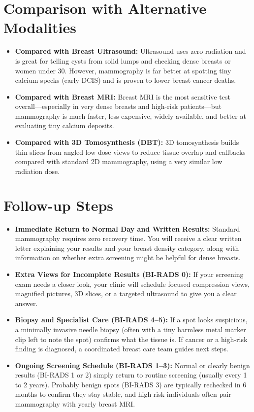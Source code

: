\section{Comparison with Alternative Modalities}

\begin{itemize}
    \item \textbf{Compared with Breast Ultrasound:} Ultrasound uses zero radiation and is great for telling cysts from solid lumps and checking dense breasts or women under 30. However, mammography is far better at spotting tiny calcium specks (early DCIS) and is proven to lower breast cancer deaths.
    \item \textbf{Compared with Breast MRI:} Breast MRI is the most sensitive test overall---especially in very dense breasts and high-risk patients---but mammography is much faster, less expensive, widely available, and better at evaluating tiny calcium deposits.
    \item \textbf{Compared with 3D Tomosynthesis (DBT):} 3D tomosynthesis builds thin slices from angled low-dose views to reduce tissue overlap and callbacks compared with standard 2D mammography, using a very similar low radiation dose.
\end{itemize}

\section{Follow-up Steps}

\begin{itemize}
    \item \textbf{Immediate Return to Normal Day and Written Results:} Standard mammography requires zero recovery time. You will receive a clear written letter explaining your results and your breast density category, along with information on whether extra screening might be helpful for dense breasts.
    \item \textbf{Extra Views for Incomplete Results (BI-RADS 0):} If your screening exam needs a closer look, your clinic will schedule focused compression views, magnified pictures, 3D slices, or a targeted ultrasound to give you a clear answer.
    \item \textbf{Biopsy and Specialist Care (BI-RADS 4--5):} If a spot looks suspicious, a minimally invasive needle biopsy (often with a tiny harmless metal marker clip left to note the spot) confirms what the tissue is. If cancer or a high-risk finding is diagnosed, a coordinated breast care team guides next steps.
    \item \textbf{Ongoing Screening Schedule (BI-RADS 1--3):} Normal or clearly benign results (BI-RADS 1 or 2) simply return to routine screening (usually every 1 to 2 years). Probably benign spots (BI-RADS 3) are typically rechecked in 6 months to confirm they stay stable, and high-risk individuals often pair mammography with yearly breast MRI.
\end{itemize}


